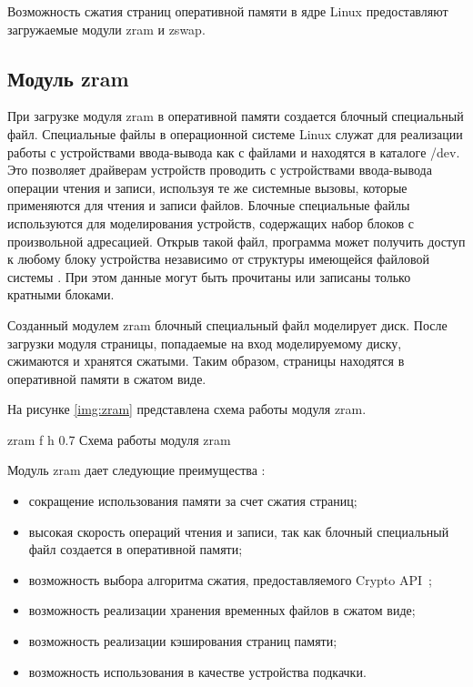 Возможность сжатия страниц оперативной памяти в ядре Linux предоставляют загружаемые модули zram и zswap.

\subsection{Модуль zram}

При загрузке модуля zram в оперативной памяти создается блочный специальный файл. Специальные файлы в операционной системе Linux служат для реализации работы с устройствами ввода-вывода как с файлами и находятся в каталоге /dev. Это позволяет драйверам устройств проводить с устройствами ввода-вывода операции чтения и записи, используя те же системные
вызовы, которые применяются для чтения и записи файлов. Блочные специальные файлы используются для моделирования устройств, содержащих набор блоков с произвольной адресацией. Открыв такой файл, программа может получить доступ к любому блоку устройства независимо от структуры имеющейся файловой системы \cite{block-file}. При этом данные могут быть прочитаны или записаны только кратными блоками.

Созданный модулем zram блочный специальный файл моделирует диск. После загрузки модуля страницы, попадаемые на вход моделируемому диску, сжимаются и хранятся сжатыми. Таким образом, страницы находятся в оперативной памяти в сжатом виде.

На рисунке \ref{img:zram} представлена схема работы модуля zram.

    {zram}
    {f}
    {h}
    {0.7\textwidth}
    {Схема работы модуля zram}

Модуль zram дает следующие преимущества \cite{zram}:

\begin{itemize}
	\item сокращение использования памяти за счет сжатия страниц;
	\item высокая скорость операций чтения и записи, так как блочный специальный файл создается в оперативной памяти;
    \item возможность выбора алгоритма сжатия, предоставляемого Crypto API~\cite{crypto};
    \item возможность реализации хранения временных файлов в сжатом виде;
    \item возможность реализации кэширования страниц памяти;
    \item возможность использования в качестве устройства подкачки.
\end{itemize}

